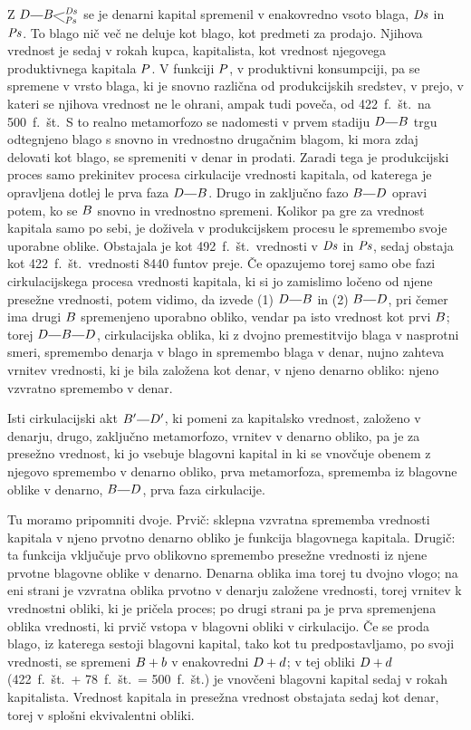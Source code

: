 \documentclass[kapital_02.tex]{subfiles}
\begin{document}
Z \(\KPED\KPEcrta\KPEBrazcepDsPs\) se je denarni kapital spremenil v enakovredno vsoto blaga, \(\mathit{Ds}\) in \(\mathit{Ps}\). To blago nič več ne deluje kot blago, kot predmeti za prodajo. Njihova vrednost je sedaj v rokah kupca, kapitalista, kot vrednost njegovega produktivnega kapitala \(P\). V funkciji \(P\), v produktivni konsumpciji, pa se spremene v vrsto blaga, ki je snovno različna od produkcijskih sredstev, v prejo, v kateri se njihova vrednost ne le ohrani, ampak tudi poveča, od 422~f.~št.\ na 500~f.~št.\ S to realno metamorfozo se nadomesti v prvem stadiju \(\KPED\KPEcrta\KPEB\) trgu odtegnjeno blago s snovno in vrednostno drugačnim blagom, ki mora zdaj delovati kot blago, se spremeniti v denar in prodati. Zaradi tega je produkcijski proces samo prekinitev procesa cirkulacije vrednosti kapitala, od katerega je opravljena dotlej le prva faza \(\KPED\KPEcrta\KPEB\). Drugo in zaključno fazo \(\KPEB\KPEcrta\KPED\) opravi potem, ko se \(B\) snovno in vrednostno spremeni. Kolikor pa gre za vrednost kapitala samo po sebi, je doživela v produkcijskem procesu le spremembo svoje uporabne oblike. Obstajala je kot 492~f.~št.\ vrednosti v \(\mathit{Ds}\) in \(\mathit{Ps}\), sedaj obstaja kot 422~f.~št.\ vrednosti 8440 funtov preje. Če opazujemo torej samo obe fazi cirkulacijskega procesa vrednosti kapitala, ki si jo zamislimo ločeno od njene presežne vrednosti, potem vidimo, da izvede (1) \(\KPED\KPEcrta\KPEB\) in (2) \(\KPEB\KPEcrta\KPED\), pri čemer ima drugi \(B\) spremenjeno uporabno obliko, vendar pa isto vrednost kot prvi \(B\); torej \(\KPED\KPEcrta\KPEB\KPEcrta\KPED\), cirkulacijska oblika, ki z dvojno premestitvijo blaga v nasprotni smeri, spremembo denarja v blago in spremembo blaga v denar, nujno zahteva vrnitev vrednosti, ki je bila založena kot denar, v njeno denarno obliko: njeno vzvratno spremembo v denar.

Isti cirkulacijski akt \(\KPEB'\KPEcrta\KPED'\), ki pomeni za kapitalsko vrednost, založeno v denarju, drugo, zaključno metamorfozo, vrnitev v denarno obliko, pa je za presežno vrednost, ki jo vsebuje blagovni kapital in ki se vnovčuje obenem z njegovo spremembo v denarno obliko, prva metamorfoza, sprememba iz blagovne oblike v denarno, \(\KPEB\KPEcrta\KPED\), prva faza cirkulacije.

Tu moramo pripomniti dvoje. Prvič: sklepna vzvratna sprememba vrednosti kapitala v njeno prvotno denarno obliko je funkcija blagovnega kapitala. Drugič: ta funkcija vključuje prvo oblikovno spremembo presežne vrednosti iz njene prvotne blagovne oblike v denarno. Denarna oblika ima torej tu dvojno vlogo; na eni strani je vzvratna oblika prvotno v denarju založene vrednosti, torej vrnitev k vrednostni obliki, ki je pričela proces; po drugi strani pa je prva spremenjena oblika vrednosti, ki prvič vstopa v blagovni obliki v cirkulacijo. Če se proda blago, iz katerega sestoji blagovni kapital, tako kot tu predpostavljamo, po svoji vrednosti, se spremeni \(B + b\) v enakovredni \(D + d\); v tej obliki \(D + d\) (422~f.~št.\ + 78~f.~št.\ = 500~f.~št.) je vnovčeni blagovni kapital sedaj v rokah kapitalista. Vrednost kapitala in presežna vrednost obstajata sedaj kot denar, torej v splošni ekvivalentni obliki.
\end{document}
